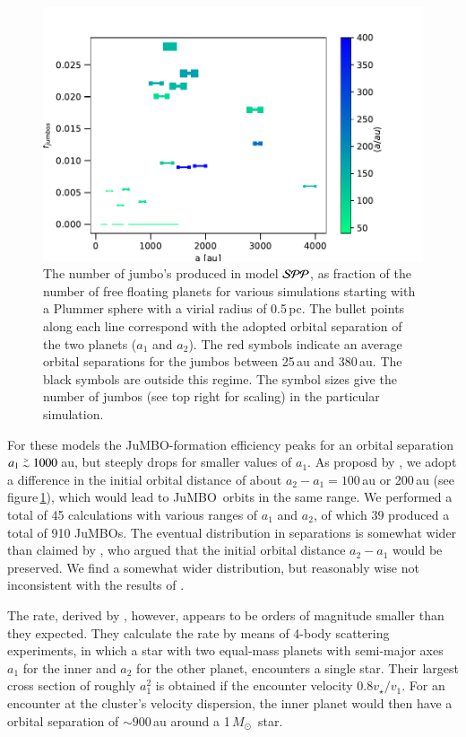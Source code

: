 \documentclass[submission,phys]{lib/SciPost}
\newcommand{\MSun}{\mbox{${M}_\odot$}}
\def\apgt{\ {\raise-.5ex\hbox{$\buildrel>\over\sim$}}\ }
\newcommand{\jumbo}{\mbox{JuMBO}}
\newcommand{\jumbos}{\mbox{JuMBOs}}
\begin{document}
\begin{figure}
    \centering
        \includegraphics[width=.91\columnwidth]{figures/fig_fjumbos_from_psystems.pdf}
        \caption{The number of jumbo's produced in model ${\cal SPP}$,
          as fraction of the number of free floating planets for
          various simulations starting with a Plummer sphere with a
          virial radius of 0.5\,pc.  The bullet points along each line
          correspond with the adopted orbital separation of the two
          planets ($a_1$ and $a_2$).  The red symbols indicate an
          average orbital separations for the jumbos between 25\,au
          and 380\,au.  The black symbols are outside this regime.
          The symbol sizes give the number of jumbos (see top right
          for scaling) in the particular simulation.  }
         \label{Fig:fjumbos_from_PP}
\end{figure}

For these models the \jumbo-formation efficiency peaks for an orbital
separation $a_1 \apgt 1000$\,au, but steeply drops for smaller values
of $a_1$. As proposd by \cite{2023arXiv231006016W}, we adopt a
difference in the initial orbital distance of about $a_2-a_1 =
100$\,au or 200\,au (see figure\,\ref{Fig:fjumbos_from_PP}), which
would lead to \jumbo\, orbits in the same range.  We performed a total
of 45 calculations with various ranges of $a_1$ and $a_2$, of which 39
produced a total of 910 \jumbos.  The eventual distribution in
separations is somewhat wider than claimed by
\cite{2023arXiv231006016W}, who argued that the initial orbital
distance $a_2-a_1$ would be preserved. We find a somewhat wider
distribution, but reasonably wise not inconsistent with the results of
\cite{2023arXiv231006016W}.

The rate, derived by \cite{2023arXiv231006016W}, however, appears to
be orders of magnitude smaller than they expected.  They calculate the
rate by means of 4-body scattering experiments, in which a star with
two equal-mass planets with semi-major axes $a_1$ for the inner and
$a_2$ for the other planet, encounters a single star. Their largest
cross section of roughly $a_1^2$ is obtained if the encounter velocity
$0.8v_\star/v_1$. For an encounter at the cluster's velocity
dispersion, the inner planet would then have a orbital separation of
$\sim 900$\,au around a 1\,\MSun\, star.
\end{document}
